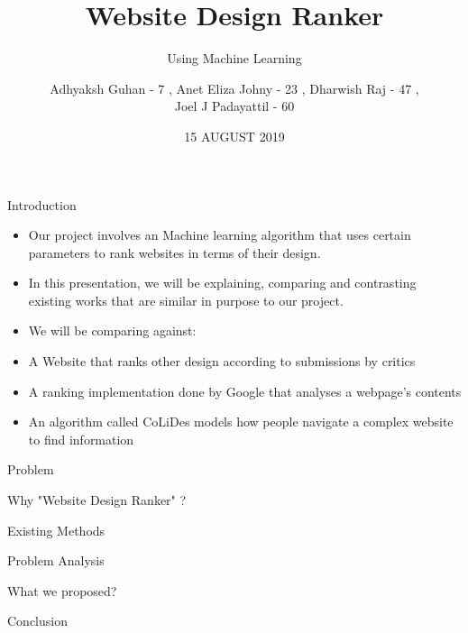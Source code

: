 \documentclass[11pt]{beamer}
\begin{document}
	\title{\textbf{Website Design Ranker}}
	\subtitle{Using Machine Learning}
	\date{15 AUGUST 2019}
	\author{{\scriptsize Adhyaksh Guhan - 7 , Anet Eliza Johny - 23 , Dharwish Raj - 47 , \\ Joel J Padayattil - 60}}
	\begin{frame}[plain]
		\maketitle
	\end{frame}
	\begin{frame}{Introduction}
		\begin{itemize}
			\item Our project involves an Machine learning algorithm that uses certain parameters to rank websites in terms of their design.
			
			\item In this presentation, we will be explaining, comparing and contrasting existing works that are similar in purpose to our project.
		
			\item We will be comparing against:
				\item A Website that ranks other design according to submissions by critics
				\item A ranking implementation done by Google that analyses a webpage's contents
				\item An algorithm called CoLiDes models how people navigate a complex website to find information
		\end{itemize}
	\end{frame}
	\begin{frame}{Problem}
	\end{frame}
	\begin{frame}{Why "Website Design Ranker" ?}
	\end{frame}
	\begin{frame}{Existing Methods}
	\end{frame}
	\begin{frame}{Problem Analysis}
	\end{frame}
	\begin{frame}{What we proposed?}
	\end{frame}
	\begin{frame}{Conclusion}
	\end{frame}
	
\end{document}

